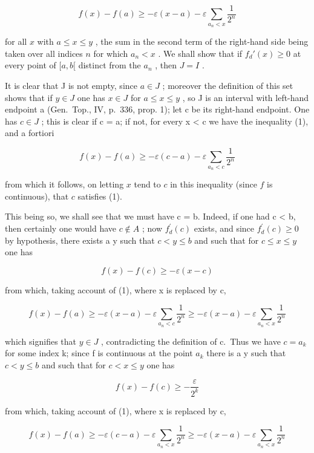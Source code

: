 \[
f (x) - f (a) \geqslant - \varepsilon (x - a) - \varepsilon \sum_ {a _ {n} <   x} \frac {1}{2 ^ {n}}\tag{1}
\]

for all \(x\) with \(a \leqslant x \leqslant y\) , the sum in the second term of the right-hand side being taken over all indices \(n\) for which \(a_n < x\) . We shall show that if \(f_d'(x) \geqslant 0\) at every point of \([a, b[\) distinct from the \(a_n\) , then \(J = I\) .

It is clear that J is not empty, since \(a \in J\) ; moreover the definition of this set shows that if \(y \in J\) one has \(x \in J\) for \(a \leqslant x \leqslant y\) , so J is an interval with left-hand endpoint a (Gen.~Top., IV, p.~336, prop. 1); let c be its right-hand endpoint. One has \(c \in J\) ; this is clear if c = a; if not, for every x \textless{} c we have the inequality (1), and a fortiori

\[
f (x) - f (a) \geqslant - \varepsilon (c - a) - \varepsilon \sum_ {a _ {n} <   c} \frac {1}{2 ^ {n}}
\]

from which it follows, on letting \(x\) tend to \(c\) in this inequality (since \(f\) is continuous), that \(c\) satisfies (1).

This being so, we shall see that we must have c = b. Indeed, if one had c \textless{} b, then certainly one would have \(c \notin A\) ; now \(f_{d}^{\prime}(c)\) exists, and since \(f_{d}^{\prime}(c) \geqslant 0\) by hypothesis, there exists a y such that \(c < y \leqslant b\) and such that for \(c \leqslant x \leqslant y\) one has

\[
f (x) - f (c) \geqslant - \varepsilon (x - c)
\]

from which, taking account of (1), where x is replaced by c,

\[
f (x) - f (a) \geqslant - \varepsilon (x - a) - \varepsilon \sum_ {a _ {n} <   c} \frac {1}{2 ^ {n}} \geqslant - \varepsilon (x - a) - \varepsilon \sum_ {a _ {n} <   x} \frac {1}{2 ^ {n}}
\]

which signifies that \(y \in J\) , contradicting the definition of c.~Thus we have \(c = a_{k}\) for some index k; since f is continuous at the point \(a_{k}\) there is a y such that \(c < y \leqslant b\) and such that for \(c < x \leqslant y\) one has

\[
f (x) - f (c) \geqslant - \frac {\varepsilon}{2 ^ {k}}
\]

from which, taking account of (1), where x is replaced by c,

\[
f (x) - f (a) \geqslant - \varepsilon (c - a) - \varepsilon \sum_ {a _ {n} <   x} \frac {1}{2 ^ {n}} \geqslant - \varepsilon (x - a) - \varepsilon \sum_ {a _ {n} <   x} \frac {1}{2 ^ {n}}
\]

